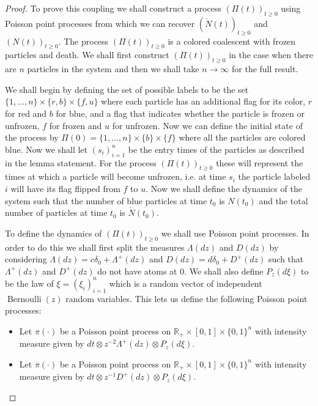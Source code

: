 \documentclass[11pt]{article}
\theoremstyle{definition}
\newcommand{\R}{\mathbb{R}}
\begin{document}
\begin{proof}
    To prove this coupling we shall construct a process $(\Pi(t))_{t \geq 0}$ using Poisson point processes from which we can recover $(\mathring{N}(t))_{t \geq 0}$ and $(N(t))_{t \geq 0}$. The process $(\Pi(t))_{t \geq 0}$ is a colored coalescent with frozen particles and death. We shall first construct $(\Pi(t))_{t \geq 0}$ in the case when there are $n$ particles in the system and then we shall take $n \to \infty$ for the full result. 
    \medskip

    \noindent We shall begin by defining the set of possible labels to be the set $\{1, \ldots, n\} \times \{r,b\} \times\{f, u\}$ where each particle has an additional flag for its color, $r$ for red and $b$ for blue, and a flag that indicates whether the particle is frozen or unfrozen, $f$ for frozen and $u$ for unfrozen. Now we can define the initial state of the process by $\Pi(0) = \{1, \ldots, n\} \times \{b\} \times \{f\}$ where all the particles are colored blue. Now we shall let $(s_i)_{i = 1}^n$ be the entry times of the particles as described in the lemma statement. For the process $(\Pi(t))_{t \geq 0}$ these will represent the times at which a particle will become unfrozen, i.e. at time $s_i$ the particle labeled $i$ will have its flag flipped from $f$ to $u$. Now we shall define the dynamics of the system such that the number of blue particles at time $t_0$ is $N(t_0)$ and the total number of particles at time $t_0$ is $\mathring{N}(t_0)$.
    \medskip

    \noindent To define the dynamics of $(\Pi(t))_{t \geq 0}$ we shall use Poisson point processes. In order to do this we shall first split the measures $\Lambda(dz)$ and $D(dz)$ by considering $\Lambda(dz) = c \delta_0 + \Lambda^+(dz)$ and $D(dz) = d \delta_0 + D^+(dz)$ such that $\Lambda^+(dz)$ and $D^+(dz)$ do not have atoms at $0$. We shall also define $P_z(d\xi)$ to be the law of $\xi = (\xi_i)_{i = 1}^n$ which is a random vector of independent $\operatorname{Bernoulli}(z)$ random variables. This lets us define the following Poisson point processes:

    \begin{itemize}
        \item Let $\pi(\cdot)$ be a Poisson point process on $\R_+ \times [0,1] \times \{0,1\}^n$ with intensity measure given by $dt \otimes z^{-2}\Lambda^+(dz) \otimes P_z(d\xi)$.

        \item Let $\overline{\pi}(\cdot)$ be a Poisson point process on $\R_+ \times [0,1] \times \{0,1\}^n$ with intensity measure given by $dt \otimes z^{-1}D^+(dz) \otimes P_z(d\xi)$.


\end{itemize}
\end{proof}
\end{document}
